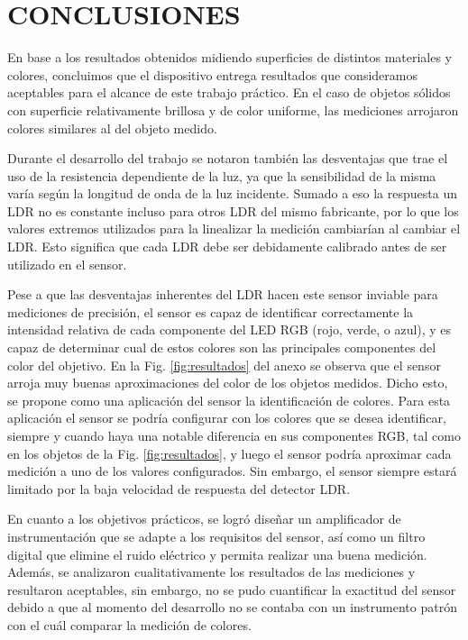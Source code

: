 \documentclass[12pt,a4paper,twoside,fleqn]{article}
\begin{document}
\section*{CONCLUSIONES}
En base a los resultados obtenidos midiendo superficies de distintos materiales y colores, concluimos que el dispositivo entrega resultados que consideramos aceptables para el alcance de este trabajo práctico. En el caso de objetos sólidos con superficie relativamente brillosa y de  color uniforme, las mediciones arrojaron colores similares al del objeto medido.

Durante el desarrollo del trabajo se notaron también las desventajas que trae el uso de la resistencia dependiente de la luz, ya que la sensibilidad de la misma varía según la longitud de onda de la luz incidente. Sumado a eso la respuesta un LDR no es constante incluso para otros LDR del mismo fabricante, por lo que los valores extremos utilizados para la linealizar la medición cambiarían al cambiar el LDR. Esto significa que cada LDR debe ser debidamente calibrado antes de ser utilizado en el sensor.

Pese a que las desventajas inherentes del LDR hacen este sensor inviable para mediciones de precisión, el sensor es capaz de identificar correctamente la intensidad relativa de cada componente del LED RGB (rojo, verde, o azul), y es capaz de determinar cual de estos colores son las principales componentes del color del objetivo. En la Fig. \ref{fig:resultados} del anexo se observa que el sensor arroja muy buenas aproximaciones del color de los objetos medidos. Dicho esto, se propone como una aplicación del sensor la identificación de colores. Para esta aplicación el sensor se podría configurar con los colores que se desea identificar, siempre y cuando haya una notable diferencia en sus componentes RGB, tal como en los objetos de la Fig. \ref{fig:resultados}, y luego el sensor podría aproximar cada medición a uno de los valores configurados. Sin embargo, el sensor siempre estará limitado por la baja velocidad de respuesta del detector LDR.

En cuanto a los objetivos prácticos, se logró diseñar un amplificador de instrumentación que se adapte a los requisitos del sensor, así como un filtro digital que elimine el ruido eléctrico y permita realizar una buena medición. Además, se analizaron cualitativamente los resultados de las mediciones y resultaron aceptables, sin embargo, no se pudo cuantificar la exactitud del sensor debido a que al momento del desarrollo no se contaba con un instrumento patrón con el cuál comparar la medición de colores.
\end{document}
